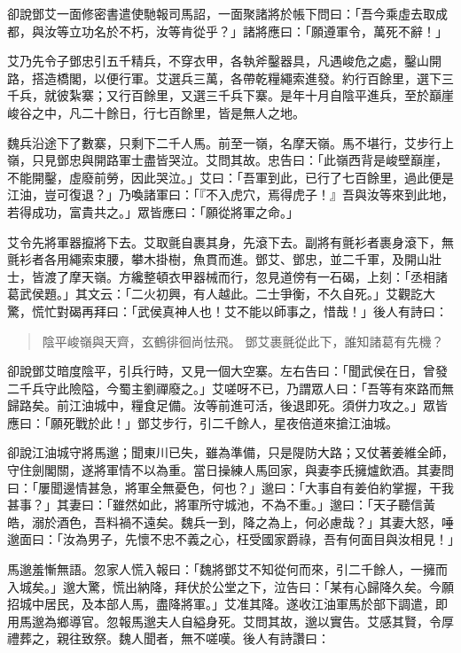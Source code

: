 卻說鄧艾一面修密書遣使馳報司馬詔，一面聚諸將於帳下問曰：「吾今乘虛去取成都，與汝等立功名於不朽，汝等肯從乎？」諸將應曰：「願遵軍令，萬死不辭！」

艾乃先令子鄧忠引五千精兵，不穿衣甲，各執斧鑿器具，凡遇峻危之處，鑿山開路，搭造橋閣，以便行軍。艾選兵三萬，各帶乾糧繩索進發。約行百餘里，選下三千兵，就彼紮寨；又行百餘里，又選三千兵下寨。是年十月自陰平進兵，至於巔崖峻谷之中，凡二十餘日，行七百餘里，皆是無人之地。

魏兵沿途下了數寨，只剩下二千人馬。前至一嶺，名摩天嶺。馬不堪行，艾步行上嶺，只見鄧忠與開路軍士盡皆哭泣。艾問其故。忠告曰：「此嶺西背是峻壁巔崖，不能開鑿，虛廢前勞，因此哭泣。」艾曰：「吾軍到此，已行了七百餘里，過此便是江油，豈可復退？」乃喚諸軍曰：「『不入虎穴，焉得虎子！』吾與汝等來到此地，若得成功，富貴共之。」眾皆應曰：「願從將軍之命。」

艾令先將軍器攛將下去。艾取氈自裹其身，先滾下去。副將有氈衫者裹身滾下，無氈衫者各用繩索束腰，攀木掛樹，魚貫而進。鄧艾、鄧忠，並二千軍，及開山壯士，皆渡了摩天嶺。方纔整頓衣甲器械而行，忽見道傍有一石碣，上刻：「丞相諸葛武侯題。」其文云：「二火初興，有人越此。二士爭衡，不久自死。」艾觀訖大驚，慌忙對碣再拜曰：「武侯真神人也！艾不能以師事之，惜哉！」後人有詩曰：

\begin{quote}
陰平峻嶺與天齊，玄鶴徘徊尚怯飛。
鄧艾裹氈從此下，誰知諸葛有先機？
\end{quote}

卻說鄧艾暗度陰平，引兵行時，又見一個大空寨。左右告曰：「聞武侯在日，曾發二千兵守此險隘，今蜀主劉禪廢之。」艾嗟呀不已，乃謂眾人曰：「吾等有來路而無歸路矣。前江油城中，糧食足備。汝等前進可活，後退即死。須併力攻之。」眾皆應曰：「願死戰於此！」鄧艾步行，引二千餘人，星夜倍道來搶江油城。

卻說江油城守將馬邈；聞東川已失，雖為準備，只是隄防大路；又仗著姜維全師，守住劍閣關，遂將軍情不以為重。當日操練人馬回家，與妻李氏擁爐飲酒。其妻問曰：「屢聞邊情甚急，將軍全無憂色，何也？」邈曰：「大事自有姜伯約掌握，干我甚事？」其妻曰：「雖然如此，將軍所守城池，不為不重。」邈曰：「天子聽信黃皓，溺於酒色，吾料禍不遠矣。魏兵一到，降之為上，何必慮哉？」其妻大怒，唾邈面曰：「汝為男子，先懷不忠不義之心，枉受國家爵祿，吾有何面目與汝相見！」

馬邈羞慚無語。忽家人慌入報曰：「魏將鄧艾不知從何而來，引二千餘人，一擁而入城矣。」邈大驚，慌出納降，拜伏於公堂之下，泣告曰：「某有心歸降久矣。今願招城中居民，及本部人馬，盡降將軍。」艾准其降。遂收江油軍馬於部下調遣，即用馬邈為鄉導官。忽報馬邈夫人自縊身死。艾問其故，邈以實告。艾感其賢，令厚禮葬之，親往致祭。魏人聞者，無不嗟嘆。後人有詩讚曰：

